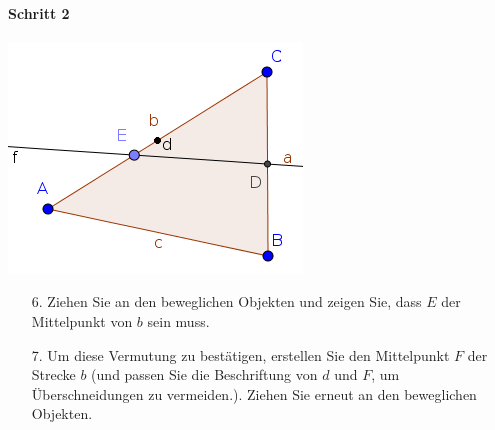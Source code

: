 \documentclass{article}
\begin{document}
\paragraph{Schritt 2}
\begin{center}
\includegraphics[scale=0.5]{classroom2}
\end{center}
\begin{enumerate}
    \item[6.] Ziehen Sie an den beweglichen Objekten und zeigen Sie, dass $E$ der Mittelpunkt von $b$ sein muss.
    \item[7.] Um diese Vermutung zu bestätigen, erstellen Sie den Mittelpunkt $F$ der Strecke $b$ (und passen Sie die Beschriftung von $d$ und $F$, um Überschneidungen zu vermeiden.). Ziehen Sie erneut an den beweglichen Objekten.
\end{enumerate}
\end{document}
